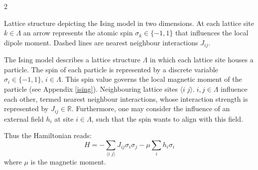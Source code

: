 \documentclass [10pt]{article}
\newcommand {\qeval}[1] {\langle #1 \rangle}
\begin{document}
\begin {multicols}{2}
\vspace {0.3cm}
\begin {center}

	{
	Lattice structure depicting the Ising model in two dimensions. At each
	lattice site $k \in \Lambda$ an arrow represents the atomic spin
	$\sigma_k \in \{-1, 1\}$ that influences the local dipole moment. Dashed
	lines are nearest neighbour interactions $J_{ij}$.
}
\end {center}
\vspace {0.3cm}

The Ising model describes a lattice structure $\Lambda$ in which each lattice
site houses a particle. The spin of each particle is represented by a discrete
variable $\sigma_i \in \{-1, 1\}$, $i \in \Lambda$. This spin value governs the
local magnetic moment of the particle (see Appendix \ref{ising}).
Neighbouring lattice sites $\qeval{i\;j}. \; i, j \in \Lambda$ influence each
other, termed nearest neighbour interactions, whose interaction strength is
represented by $J_{ij} \in \mathbb R$. Furthermore, one may consider the
influence of an external field $h_i$ at site $i \in \Lambda$, such that the
spin wants to align with this field.

Thus the Hamiltonian reads:
\begin {equation}
\label {isingspin}
H = - \sum_{\qeval{i\;j}} J_{ij} \sigma_i \sigma_j - \mu \sum_{i} h_i \sigma_i
\end {equation}
where $\mu$ is the magnetic moment.


\end{multicols}
\end{document}
